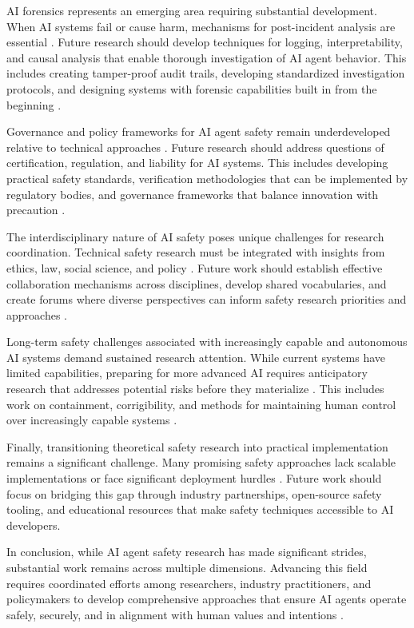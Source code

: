 \documentclass[conference]{IEEEtran}
\begin{document}
AI forensics represents an emerging area requiring substantial development. When AI systems fail or cause harm, mechanisms for post-incident analysis are essential \cite{1912.06497}. Future research should develop techniques for logging, interpretability, and causal analysis that enable thorough investigation of AI agent behavior. This includes creating tamper-proof audit trails, developing standardized investigation protocols, and designing systems with forensic capabilities built in from the beginning \cite{2504.16110}.

Governance and policy frameworks for AI agent safety remain underdeveloped relative to technical approaches \cite{2002.05671}. Future research should address questions of certification, regulation, and liability for AI systems. This includes developing practical safety standards, verification methodologies that can be implemented by regulatory bodies, and governance frameworks that balance innovation with precaution \cite{2410.18114}.

The interdisciplinary nature of AI safety poses unique challenges for research coordination. Technical safety research must be integrated with insights from ethics, law, social science, and policy \cite{2012.02592}. Future work should establish effective collaboration mechanisms across disciplines, develop shared vocabularies, and create forums where diverse perspectives can inform safety research priorities and approaches \cite{2201.10436}.

Long-term safety challenges associated with increasingly capable and autonomous AI systems demand sustained research attention. While current systems have limited capabilities, preparing for more advanced AI requires anticipatory research that addresses potential risks before they materialize \cite{2302.09270}. This includes work on containment, corrigibility, and methods for maintaining human control over increasingly capable systems \cite{2410.18114}.

Finally, transitioning theoretical safety research into practical implementation remains a significant challenge. Many promising safety approaches lack scalable implementations or face significant deployment hurdles \cite{2411.12275}. Future work should focus on bridging this gap through industry partnerships, open-source safety tooling, and educational resources that make safety techniques accessible to AI developers.

In conclusion, while AI agent safety research has made significant strides, substantial work remains across multiple dimensions. Advancing this field requires coordinated efforts among researchers, industry practitioners, and policymakers to develop comprehensive approaches that ensure AI agents operate safely, securely, and in alignment with human values and intentions \cite{2410.06946}.
\end{document}
